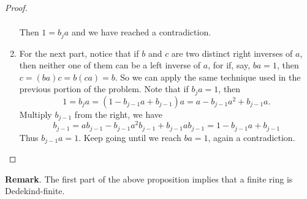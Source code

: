 \documentclass[12pt]{article}
\begin{document}
\begin{proof}
\begin{enumerate}
\begin{eqnarray*}
\end{eqnarray*}
Then $1=b_ja$ and we have reached a contradiction.
\item
For the next part, notice that if $b$ and $c$ are two distinct right inverses of $a$, then neither one of them
can be a left inverse of $a$, for if, say, $ba=1$, then $c=(ba)c=b(ca)=b$.  So we can apply the same technique
used in the previous portion of the problem.  Note that if $b_ja=1$, then
$$1=b_ja=(1-b_{j-1}a+b_{j-1})a=a-b_{j-1}a^2+b_{j-1}a.$$  Multiply $b_{j-1}$ from the right, we have
$$b_{j-1}=ab_{j-1}-b_{j-1}a^2b_{j-1}+b_{j-1}ab_{j-1}=1-b_{j-1}a+b_{j-1}$$
Thus $b_{j-1}a=1$.  Keep going until we reach $ba=1$, again a contradiction.
\end{enumerate}
\end{proof}

\textbf{Remark}.  The first part of the above proposition implies that a finite ring is Dedekind-finite.
\end{document}
